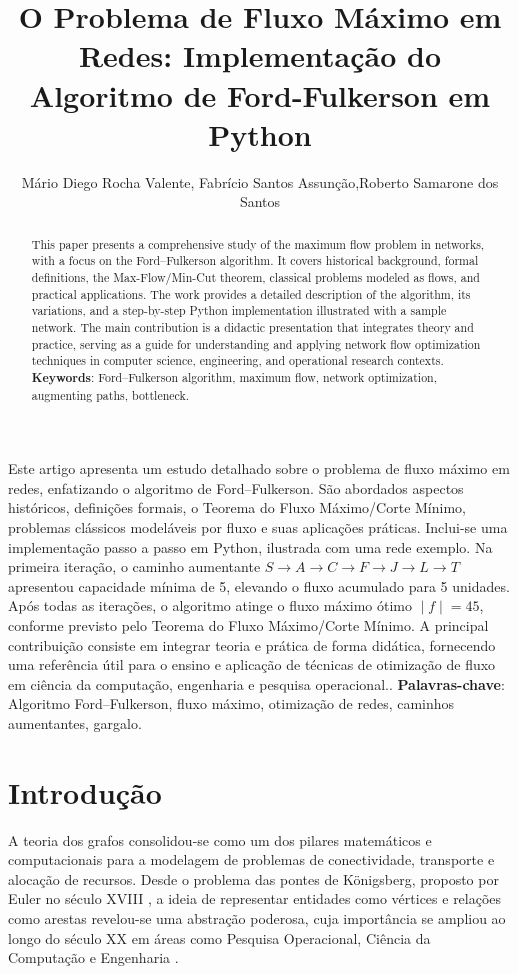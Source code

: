 \documentclass[12pt]{article}
\title{O Problema de Fluxo Máximo em Redes: Implementação do Algoritmo de Ford-Fulkerson em Python}
\author{Mário Diego Rocha Valente\inst{1}, Fabrício Santos Assunção\inst{1},Roberto Samarone dos Santos\inst{2}}
\begin{document}
 
\maketitle

\begin{abstract}
  This paper presents a comprehensive study of the maximum flow problem in networks, with a focus on the Ford–Fulkerson algorithm. It covers historical background, formal definitions, the Max-Flow/Min-Cut theorem, classical problems modeled as flows, and practical applications. The work provides a detailed description of the algorithm, its variations, and a step-by-step Python implementation illustrated with a sample network. The main contribution is a didactic presentation that integrates theory and practice, serving as a guide for understanding and applying network flow optimization techniques in computer science, engineering, and operational research contexts.\vskip0.3cm
  \textbf{Keywords}: Ford–Fulkerson algorithm, maximum flow, network optimization, augmenting paths, bottleneck.
\end{abstract}
     
\begin{resumo} 
Este artigo apresenta um estudo detalhado sobre o problema de fluxo máximo em redes, enfatizando o algoritmo de Ford–Fulkerson. São abordados aspectos históricos, definições formais, o Teorema do Fluxo Máximo/Corte Mínimo, problemas clássicos modeláveis por fluxo e suas aplicações práticas. Inclui-se uma implementação passo a passo em Python, ilustrada com uma rede exemplo. Na primeira iteração, o caminho aumentante 
$S→A→C→F→J→L→T$ apresentou capacidade mínima de 5, elevando o fluxo acumulado para 5 unidades. Após todas as iterações, o algoritmo atinge o fluxo máximo ótimo $∣f∣=45$, conforme previsto pelo Teorema do Fluxo Máximo/Corte Mínimo. A principal contribuição consiste em integrar teoria e prática de forma didática, fornecendo uma referência útil para o ensino e aplicação de técnicas de otimização de fluxo em ciência da computação, engenharia e pesquisa operacional.. \vskip0.3cm
 \textbf{Palavras-chave}: Algoritmo Ford–Fulkerson, fluxo máximo, otimização de redes, caminhos aumentantes, gargalo.
\end{resumo}

\newpage
\section{Introdução}

A teoria dos grafos consolidou-se como um dos pilares matemáticos e computacionais para a modelagem de problemas de conectividade, transporte e alocação de recursos. Desde o problema das pontes de Königsberg, proposto por Euler no século XVIII \cite{euler1736}, a ideia de representar entidades como vértices e relações como arestas revelou-se uma abstração poderosa, cuja importância se ampliou ao longo do século XX em áreas como Pesquisa Operacional, Ciência da Computação e Engenharia \cite{bondy1976,west2001}.
\end{document}
